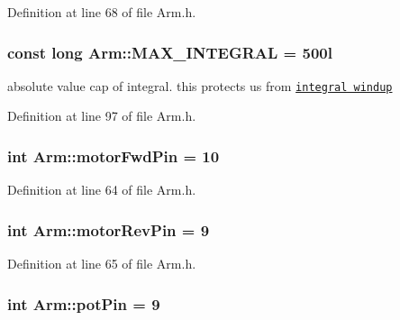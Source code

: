 Definition at line 68 of file Arm.\-h.

\hypertarget{classArm_a05988f2c31e40dd3894c1343bf73a7b8}{
\subsubsection[{M\-A\-X\-\_\-\-I\-N\-T\-E\-G\-R\-A\-L}]{\setlength{\rightskip}{0pt plus 5cm}const long Arm\-::\-M\-A\-X\-\_\-\-I\-N\-T\-E\-G\-R\-A\-L = 500l\hspace{0.3cm}{\ttfamily [private]}}}\label{classArm_a05988f2c31e40dd3894c1343bf73a7b8}


absolute value cap of integral. this protects us from \href{https://en.wikipedia.org/wiki/Integral_windup}{\tt integral windup} 



Definition at line 97 of file Arm.\-h.

\hypertarget{classArm_ad4a5718ff10ff30ece49108effc28dd2}{
\subsubsection[{motor\-Fwd\-Pin}]{\setlength{\rightskip}{0pt plus 5cm}int Arm\-::motor\-Fwd\-Pin = 10\hspace{0.3cm}{\ttfamily [private]}}}\label{classArm_ad4a5718ff10ff30ece49108effc28dd2}


Definition at line 64 of file Arm.\-h.

\hypertarget{classArm_a0d5927881e33ce4e039a71e83d7caf6a}{
\subsubsection[{motor\-Rev\-Pin}]{\setlength{\rightskip}{0pt plus 5cm}int Arm\-::motor\-Rev\-Pin = 9\hspace{0.3cm}{\ttfamily [private]}}}\label{classArm_a0d5927881e33ce4e039a71e83d7caf6a}


Definition at line 65 of file Arm.\-h.

\hypertarget{classArm_a73ec96a3c36efbf71fe5301b82e9fd4d}{
\subsubsection[{pot\-Pin}]{\setlength{\rightskip}{0pt plus 5cm}int Arm\-::pot\-Pin = 9\hspace{0.3cm}{\ttfamily [private]}}}\label{classArm_a73ec96a3c36efbf71fe5301b82e9fd4d}


